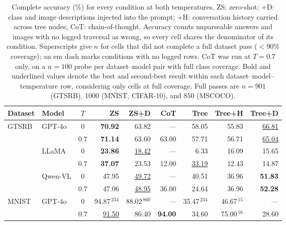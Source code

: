 \begin{table}[t]
\centering
\caption{Complete accuracy (\%) for every condition at both temperatures. ZS: zero-shot; +D: class and image descriptions injected into the prompt; +H: conversation history carried across tree nodes; CoT: chain-of-thought. Accuracy counts unparseable answers and images with no logged traversal as wrong, so every cell shares the denominator of its condition. Superscripts give $n$ for cells that did not complete a full dataset pass ($<90\%$ coverage); an em dash marks conditions with no logged rows. CoT was run at $T{=}0.7$ only, on a $n{=}100$ probe per dataset--model pair with full class coverage. Bold and underlined values denote the best and second-best result within each dataset--model--temperature row, considering only cells at full coverage. Full passes are $n=901$ (GTSRB), $1000$ (MNIST, CIFAR-10), and $850$ (MSCOCO).}
\label{tab:supp_full}
\footnotesize
\setlength{\tabcolsep}{4.6pt}
\begin{tabular}{@{}ll c rrrrrr@{}}
\toprule
\textbf{Dataset} & \textbf{Model} & $T$ & \textbf{ZS} & \textbf{ZS+D} & \textbf{CoT} & \textbf{Tree} & \textbf{Tree+H} & \textbf{Tree+D} \\
\midrule
GTSRB     & GPT-4o   & $0$ &   \textbf{70.92} &            63.82 &              --- &            58.05 &            55.83 & \underline{66.81} \\
          &          & $0.7$ &   \textbf{71.14} &            63.60 &            63.00 &            57.71 &            56.71 & \underline{65.04} \\
\cmidrule(l){2-9}
          & LLaMA    & $0$ &   \textbf{23.86} & \underline{18.42} &              --- &             6.33 &            16.09 &            15.65 \\
          &          & $0.7$ &   \textbf{37.07} &            23.53 &            12.00 & \underline{33.19} &            12.43 &            14.87 \\
\cmidrule(l){2-9}
          & Qwen-VL  & $0$ &            47.95 & \underline{49.72} &              --- &            40.51 &            36.96 &   \textbf{51.83} \\
          &          & $0.7$ &            47.06 & \underline{48.95} &            36.00 &            24.64 &            36.96 &   \textbf{52.28} \\
\midrule
MNIST     & GPT-4o   & $0$ &  94.87$^{\,234}$ &  88.02$^{\,860}$ &              --- &  35.47$^{\,234}$ &   46.67$^{\,15}$ &              --- \\
          &          & $0.7$ & \underline{91.50} &            86.40 &   \textbf{94.00} &            34.60 &   75.00$^{\,16}$ &            28.60 \\

\end{tabular}
\end{table}
